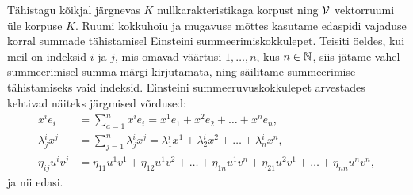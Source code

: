 Tähistagu kõikjal järgnevas $K$ nullkarakteristikaga korpust ning $\mathcal{V}$
vektorruumi üle korpuse $K$. Ruumi kokkuhoiu ja mugavuse mõttes
kasutame edaspidi vajaduse korral summade tähistamisel
Einsteini summeerimiskokkulepet. Teisiti öeldes, kui meil on indeksid
$i$ ja $j$, mis omavad väärtusi $1, \dots, n$, kus $n \in \mathbb{N}$, siis jätame
vahel summeerimisel summa märgi kirjutamata, ning säilitame summeerimise
tähistamiseks vaid indeksid. Einsteini summeeruvuskokkulepet arvestades
kehtivad näiteks järgmised võrdused:
\begin{align*}
    x^{i} e_{i} &= \sum_{a=1}^{n} x^{i} e_{i} = 
        x^{1} e_{1} + x^{2} e_{2} + \dots + x^{n} e_{n}, \\
    \lambda{^i_j} x^{j} &= \sum_{j=1}^{n} 
        \lambda{^i_j} x^{j} = \lambda{^i_1} x^{1} + 
        \lambda{^i_2} x^{2} + 
        \dots +\lambda{^i_n} x^{n},\\
    \eta_{ij} u^{i} v^{j} &= \eta_{11} u^{1} v^{1} + 
        \eta_{12} u^{1} v^{2} + \dots + \eta_{1n} u^{1} v^{n} + 
        \eta_{21} u^{2} v^{1} + \dots + \eta_{nn} u^{n} v^{n},
\end{align*}
ja nii edasi.
